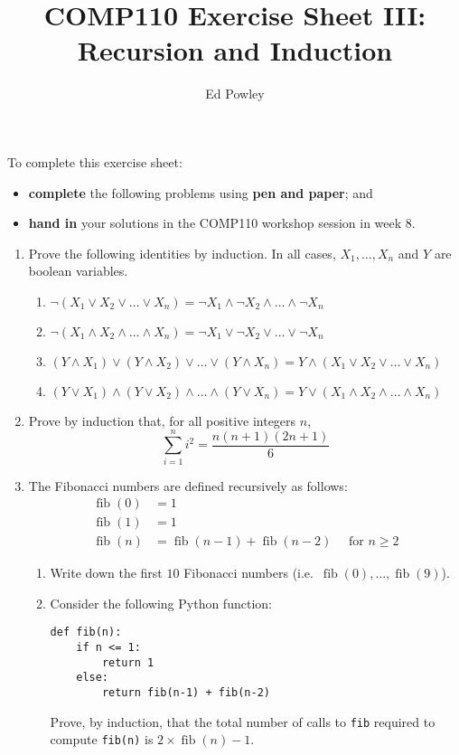 \documentclass{../../../fal_assignment}
\title{COMP110 Exercise Sheet III: Recursion and Induction}
\author{Ed Powley}
\newcommand{\OPand}{\wedge}
\newcommand{\OPor}{\vee}
\newcommand{\OPnot}{\neg}
\newcommand{\fib}{\operatorname{fib}}
\begin{document}
\maketitle

To complete this exercise sheet:
\begin{itemize}
    \item \textbf{complete} the following problems using \textbf{pen and paper}; and
    \item \textbf{hand in} your solutions in the COMP110 workshop session in week 8.
\end{itemize}

\begin{enumerate}
    \item Prove the following identities by induction. In all cases, $X_1, \dots, X_n$ and $Y$ are
		boolean variables.
        \begin{enumerate}
            \item $\OPnot (X_1 \OPor X_2 \OPor \dots \OPor X_n) = \OPnot X_1 \OPand \OPnot X_2 \OPand \dots \OPand \OPnot X_n$
            \item $\OPnot (X_1 \OPand X_2 \OPand \dots \OPand X_n) = \OPnot X_1 \OPor \OPnot X_2 \OPor \dots \OPor \OPnot X_n$
            \item $(Y \OPand X_1) \OPor (Y \OPand X_2) \OPor \dots \OPor (Y \OPand X_n) = Y \OPand (X_1 \OPor X_2 \OPor \dots \OPor X_n)$
            \item $(Y \OPor X_1) \OPand (Y \OPor X_2) \OPand \dots \OPand (Y \OPor X_n) = Y \OPor (X_1 \OPand X_2 \OPand \dots \OPand X_n)$
        \end{enumerate}
		\vspace{1ex}
	\item Prove by induction that, for all positive integers $n$,
		$$ \sum_{i=1}^n i^2 = \frac{n(n+1)(2n+1)}{6} $$
	\item The Fibonacci numbers are defined recursively as follows:
		\begin{align*}
			\fib(0) &= 1 \\
			\fib(1) &= 1 \\
			\fib(n) &= \fib(n-1) + \fib(n-2) \quad \text{ for $n \geq 2$}
		\end{align*}
        \begin{enumerate}
            \item Write down the first $10$ Fibonacci numbers (i.e.\ $\fib(0), \dots, \fib(9)$).
			\item Consider the following Python function:
\begin{lstlisting}
def fib(n):
    if n <= 1:
	    return 1
	else:
	    return fib(n-1) + fib(n-2)
\end{lstlisting}
				Prove, by induction, that the total number of calls to \lstinline{fib} required to compute
				\lstinline{fib(n)} is $2 \times \fib(n) - 1$.
        \end{enumerate}
\end{enumerate}
\end{document}
